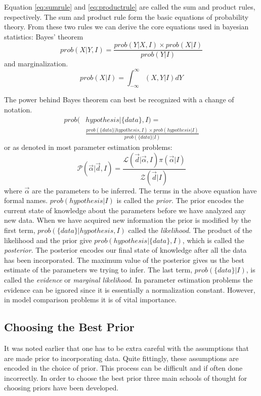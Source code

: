 \documentclass[12pt]{article}
\numberwithin{equation}{section}
\begin{document}
Equation \ref{eq:sumrule} and \ref{eq:productrule} are called the sum and product 
rules, respectively. The sum and product rule form the basic equations of probability 
theory. From these two rules we can derive the core equations used in bayesian 
statistics: Bayes' theorem
\begin{equation} \label{eq:bayes1}
	prob(X|Y,I) = \frac{prob(Y|X,I) \times prob(X|I)}{prob(Y|I)}
\end{equation}
and marginalization.
\begin{equation} \label{eq:marginalization}
	prob(X|I) = \int_{-\infty}^{\infty}{(X,Y|I)dY}
\end{equation}

The power behind Bayes theorem can best be recognized with a change of notation. 
\begin{align}\label{eq:bayes2}
	prob(&hypothesis|\{data\},I) =  \nonumber \\ 
	& \frac{prob(\{data\}|hypothesis,I) \times prob(hypothesis|I)}{prob(\{data\}|I)}
\end{align}
or as denoted in most parameter estimation problems:
\begin{equation} \label{eq:bayes3}
\mathcal{P}(\vec{\alpha}|\vec{d},I) = \frac{\mathcal{L}(\vec{d}|\vec{\alpha},I)\pi(\vec{\alpha}|I)}{\mathcal{Z}(\vec{d}|I)}
\end{equation}
where $\vec{\alpha}$ are the parameters to be inferred.
The terms in the above equation have formal names. $prob(hypothesis|I)$ is 
called the \emph{prior}. The prior encodes the current state of knowledge about the parameters before 
we have analyzed any new data. 
When we have acquired new information the prior is modified by the first term, $prob(\{data\}|hypothesis,I)$ called the 
\emph{likelihood}.
The product of the likelihood and the prior give $prob(hypothesis|\{data\},I)$, 
which is called the \emph{posterior}. The posterior encodes our final state of knowledge 
after all the data has been incorporated.
The maximum value of the posterior gives us the best estimate of the parameters we trying to infer.
The last term, $prob(\{data\}|I)$, is called the \emph{evidence} or \emph{marginal likelihood}. In parameter estimation problems the 
evidence can be ignored since it is essentially a normalization constant. However, in model comparison problems it is of vital 
importance.
\subsection{Choosing the Best Prior}
It was noted earlier that one has to be extra careful with the assumptions that are made prior 
to incorporating data. Quite fittingly, these assumptions are encoded in the choice of prior. 
This process can be difficult and if often done incorrectly. In order to choose the best prior 
three main schools of thought for choosing priors have been developed. 
\end{document}
